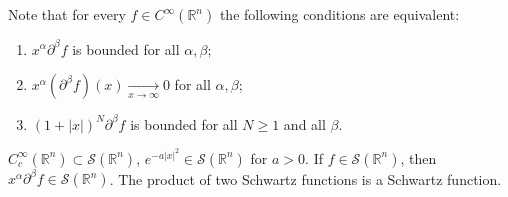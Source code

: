 Note that for every \(f\in C^{\infty}(\mathbb{R}^n)\) the following conditions are equivalent:
\begin{enumerate}
    \item \(x^{\alpha}\partial^{\beta}f\) is bounded for all \(\alpha,\beta\);
    \item \(x^{\alpha}(\partial^{\beta}f)(x)\xrightarrow[x\rightarrow\infty]{ }0\) for all \(\alpha,\beta\);
    \item \((1+|x|)^N\partial^{\beta}f\) is bounded for all \(N\geq 1\) and all \(\beta\).
\end{enumerate}
\begin{example}
    \(C^{\infty}_{c}(\mathbb{R}^n)\subset \mathcal{S}(\mathbb{R}^n)\), \(e^{-a|x|^2}\in\mathcal{S}(\mathbb{R}^n)\) for \(a>0\). If \(f\in \mathcal{S}(\mathbb{R}^n)\), then \(x^{\alpha}\partial^{\beta}f\in\mathcal{S}(\mathbb{R}^n)\). The product of two Schwartz functions is a Schwartz function. 
\end{example}

